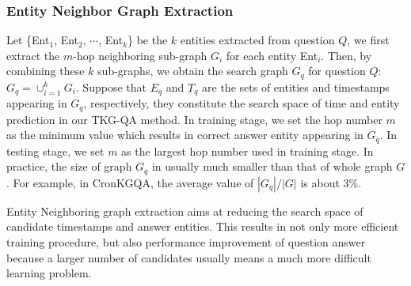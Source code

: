 \documentclass[11pt]{article}
\newcommand{\jing}[1]{{{\textcolor{red}{[jing: #1]}}}}
\newcommand{\gt}[1]{{{\textcolor{cyan}{[gt: #1]}}}}
\begin{document}
\subsubsection{Entity Neighbor Graph Extraction}


Let \{Ent$_1$, Ent$_2$, $\cdots$, Ent$_k$\} be the $k$ entities extracted from question $Q$, we first extract the $m$-hop neighboring sub-graph $G_i$ for each entity Ent$_i$. Then, by combining these $k$ sub-graphs, we obtain the search graph $G_q$ for question $Q$: $G_q =  	\cup_{i=1}^{k}G_i$. Suppose that $E_q$ and $T_q$ are the sets of entities and timestamps appearing in $G_{q}$, respectively, they constitute the search space of time and entity prediction in our TKG-QA method. In training stage, we set the hop number $m$ as the minimum value which results in correct answer entity appearing in $G_q$. In testing stage, we set $m$ as the largest hop number used in training stage. In practice, the size of graph $G_q$ in usually much smaller than that of whole graph $G$. For example, in CronKGQA, 
the average value of $|G_q|/|G|$ is about 3\%.

Entity Neighboring graph extraction aims at reducing the search space of candidate timestamps and answer entities.
This results in not only more efficient training procedure, but also performance improvement of question answer because a larger number of candidates usually means a much more difficult learning problem. 



 

\end{document}
